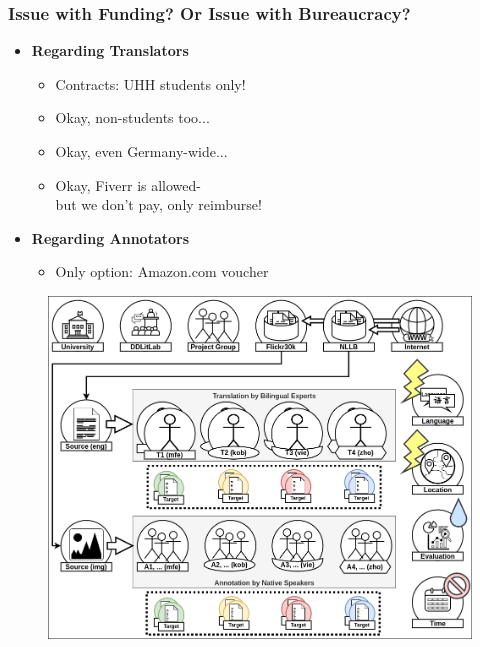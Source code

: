 \documentclass[aspectratio=169]{beamer}
\begin{document}
\begin{frame}[fragile]
	\frametitle{Issue with Funding? Or Issue with Bureaucracy?}
    \begin{minipage}{.45\textwidth}
        \centering
        \begin{itemize}
            \item \textbf{Regarding Translators}
            \begin{itemize}
                \item Contracts: UHH students only!
                \item Okay, non-students too...
                \item Okay, even Germany-wide...
                \item Okay, Fiverr is allowed- \\ but we don't pay, only reimburse!
            \end{itemize}
            \item \textbf{Regarding Annotators}
            \begin{itemize}
                \item Only option: Amazon.com voucher
            \end{itemize}
        \end{itemize}
    \end{minipage}%
    \begin{minipage}{.55\textwidth}
    \centering
        \begin{figure}
            \includegraphics[width=1.0\textwidth]{images/MTACR-Overview.png} 
        \end{figure}
    \end{minipage}
\end{frame}
\end{document}

